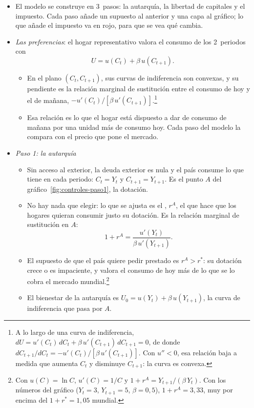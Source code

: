 \documentclass[11pt]{article}
\begin{document}
\begin{itemize}
\item El modelo se construye en 3~pasos: la autarquía, la libertad de capitales y el impuesto. Cada paso añade un supuesto al anterior y una capa al gráfico; lo que añade el impuesto va en \textcolor{tceerojo}{rojo}, para que se vea qué cambia.
\item \emph{Las preferencias}: el hogar representativo valora el consumo de los 2~periodos con
  $$U=u(C_t)+\beta\,u(C_{t+1}).$$
  \begin{itemize}
  \item En el plano $(C_t,C_{t+1})$, sus curvas de indiferencia son convexas, y su pendiente es la relación marginal de sustitución entre el consumo de hoy y el de mañana, $-u'(C_t)/[\beta\,u'(C_{t+1})]$.\footnote{A lo largo de una curva de indiferencia, $dU=u'(C_t)\,dC_t+\beta\,u'(C_{t+1})\,dC_{t+1}=0$, de donde $dC_{t+1}/dC_t=-u'(C_t)/[\beta\,u'(C_{t+1})]$. Con $u''<0$, esa relación baja a medida que aumenta $C_t$ y disminuye $C_{t+1}$: la curva es convexa.}
  \item Esa relación es lo que el hogar está dispuesto a dar de consumo de mañana por una unidad más de consumo hoy. Cada paso del modelo la compara con el precio que pone el mercado.
  \end{itemize}
\item \emph{Paso 1: la autarquía}
  \begin{itemize}
  \item Sin acceso al exterior, la deuda exterior es nula y el país consume lo que tiene en cada periodo: $C_t=Y_t$ y $C_{t+1}=Y_{t+1}$. Es el punto $A$ del gráfico~\ref{fig:controles-paso1}, la dotación.
  \item No hay nada que elegir: lo que se ajusta es el , $r^A$, el que hace que los hogares quieran consumir justo su dotación. Es la relación marginal de sustitución en $A$:
    $$1+r^A=\frac{u'(Y_t)}{\beta\,u'(Y_{t+1})}.$$
  \item El supuesto de que el país quiere pedir prestado es $r^A>r^*$: su dotación crece o es impaciente, y valora el consumo de hoy más de lo que se lo cobra el mercado mundial.\footnote{Con $u(C)=\ln C$, $u'(C)=1/C$ y $1+r^A=Y_{t+1}/(\beta\,Y_t)$. Con los números del gráfico ($Y_t=3$, $Y_{t+1}=5$, $\beta=0{,}5$), $1+r^A=3{,}33$, muy por encima del $1+r^*=1{,}05$ mundial.}
  \item El bienestar de la autarquía es $U_0=u(Y_t)+\beta\,u(Y_{t+1})$, la curva de indiferencia que pasa por $A$.
  \end{itemize}
\end{itemize}
\end{document}
